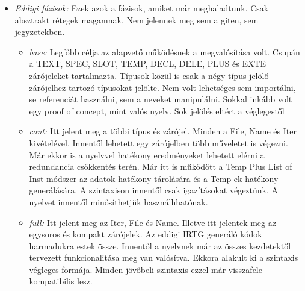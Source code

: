 {\begin{itemize}
\item \emph{Eddigi fázisok:}
Ezek azok a fázisok, amiket már meghaladtunk.
Csak absztrakt rétegek magamnak.
Nem jelennek meg sem a giten, sem jegyzetekben.
\begin{itemize}
\item \emph{base:}
Legfőbb célja az alapvető működésnek a megvalósítása volt. 
Csupán a TEXT, SPEC, SLOT, TEMP, DECL, DELE, PLUS és EXTE zárójeleket tartalmazta.
Típusok közül is csak a négy típus jelölő zárójelhez tartozó típusokat jelölte.
Nem volt lehetséges sem importálni, se referenciát használni, sem a neveket manipulálni.
Sokkal inkább volt egy proof of concept, mint valós nyelv. 
Sok jelölés eltért a véglegestől
\item \emph{cont:}
Itt jelent meg a többi típus és zárójel.
Minden a File, Name és Iter kivételével.
Innentől lehetett egy zárójelben több műveletet is végezni.
Már ekkor is a nyelvvel hatékony eredményeket lehetett elérni a redundancia csökkentés terén.
Már itt is működött a Temp Plus List of Inst módszer az adatok hatékony tárolására és a Temp-ek
hatékony generálására.
A szintaxison innentől csak igazításokat végeztünk.
A nyelvet innentől minősíthetjük használhhatónak.
\item \emph{full:}
Itt jelent meg az Iter, File és Name.
Illetve itt jelentek meg az egysoros és kompakt zárójelek.
Az eddigi IRTG generáló kódok harmadukra estek össze.
Innentől a nyelvnek már az összes kezdetektől tervezett funkcionalitása meg van valósítva.
Ekkora alakult ki a szintaxis végleges formája.
Minden jövőbeli szintaxis ezzel már visszafele kompatibilis lesz.
\end{itemize}


\end{itemize}}
